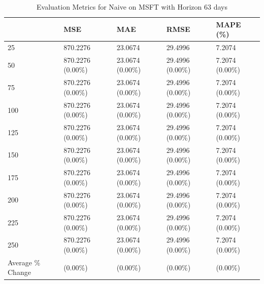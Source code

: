 \begin{table}
\caption{Evaluation Metrics for Naive on MSFT with Horizon 63 days}
\label{tab:naive_MSFT_h63_metrics}
\begin{tabular}{lllll}
\toprule
 & MSE & MAE & RMSE & MAPE (\%) \\
\midrule
25 & 870.2276 & 23.0674 & 29.4996 & 7.2074 \\
50 & 870.2276 (0.00\%) & 23.0674 (0.00\%) & 29.4996 (0.00\%) & 7.2074 (0.00\%) \\
75 & 870.2276 (0.00\%) & 23.0674 (0.00\%) & 29.4996 (0.00\%) & 7.2074 (0.00\%) \\
100 & 870.2276 (0.00\%) & 23.0674 (0.00\%) & 29.4996 (0.00\%) & 7.2074 (0.00\%) \\
125 & 870.2276 (0.00\%) & 23.0674 (0.00\%) & 29.4996 (0.00\%) & 7.2074 (0.00\%) \\
150 & 870.2276 (0.00\%) & 23.0674 (0.00\%) & 29.4996 (0.00\%) & 7.2074 (0.00\%) \\
175 & 870.2276 (0.00\%) & 23.0674 (0.00\%) & 29.4996 (0.00\%) & 7.2074 (0.00\%) \\
200 & 870.2276 (0.00\%) & 23.0674 (0.00\%) & 29.4996 (0.00\%) & 7.2074 (0.00\%) \\
225 & 870.2276 (0.00\%) & 23.0674 (0.00\%) & 29.4996 (0.00\%) & 7.2074 (0.00\%) \\
250 & 870.2276 (0.00\%) & 23.0674 (0.00\%) & 29.4996 (0.00\%) & 7.2074 (0.00\%) \\
Average \% Change & (0.00\%) & (0.00\%) & (0.00\%) & (0.00\%) \\
\bottomrule
\end{tabular}
\end{table}
